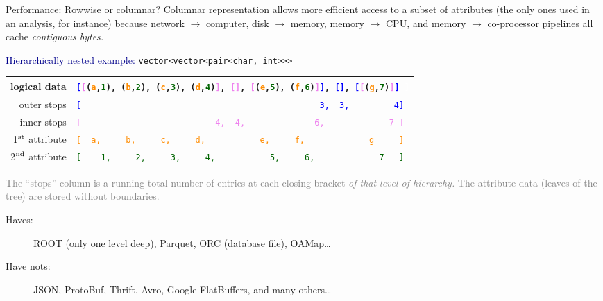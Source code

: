 \documentclass[aspectratio=169]{beamer}
\begin{document}
\begin{frame}{Performance: Rowwise or columnar?}
\vspace{0.35 cm}
Columnar representation allows more efficient access to a subset of attributes (the only ones used in an analysis, for instance) because network $\to$ computer, disk $\to$ memory, memory $\to$ CPU, and memory $\to$ co-processor pipelines all cache {\it contiguous bytes.}

\vspace{0.25 cm}
\textcolor{darkblue}{Hierarchically nested example:} {\tt\small vector<vector<pair<char, int>>>}

\vspace{0.25 cm}
\begin{tabular}{r l}
\small logical data & {\tt\scriptsize \textcolor{blue}{[}\textcolor{violet}{[}(\textcolor{darkorange}{a},\textcolor{darkgreen}{1}), (\textcolor{darkorange}{b},\textcolor{darkgreen}{2}), (\textcolor{darkorange}{c},\textcolor{darkgreen}{3}), (\textcolor{darkorange}{d},\textcolor{darkgreen}{4})\textcolor{violet}{]}, \textcolor{violet}{[]}, \textcolor{violet}{[}(\textcolor{darkorange}{e},\textcolor{darkgreen}{5}), (\textcolor{darkorange}{f},\textcolor{darkgreen}{6})\textcolor{violet}{]}\textcolor{blue}{]}, \textcolor{blue}{[]}, \textcolor{blue}{[}\textcolor{violet}{[}(\textcolor{darkorange}{g},\textcolor{darkgreen}{7})\textcolor{violet}{]}\textcolor{blue}{]}\ \textcolor{white}{]}} \\\hline
\small outer stops & {\tt\scriptsize \textcolor{blue}{[\ \ \ \ \ \ \ \ \ \ \ \ \ \ \ \ \ \ \ \ \ \ \ \ \ \ \ \ \ \ \ \ \ \ \ \ \ \ \ \ \ \ \ \ \ \ \ \ 3,\ \ 3,\ \ \ \ \ \ \ \ \ 4]}} \\
\small inner stops & {\tt\scriptsize \textcolor{violet}{[\ \ \ \ \ \ \ \ \ \ \ \ \ \ \ \ \ \ \ \ \ \ \ \ \ \ \ 4,\ \ 4,\ \ \ \ \ \ \ \ \ \ \ \ \ \ 6,\ \ \ \ \ \ \ \ \ \ \ \ \ 7\ ]}} \\
\small 1$^{\mbox{\scriptsize st}}$ attribute & {\tt\scriptsize \textcolor{darkorange}{[\ \ a,\ \ \ \ \ b,\ \ \ \ \ c,\ \ \ \ \ d,\ \ \ \ \ \ \ \ \ \ \ e,\ \ \ \ \ f,\ \ \ \ \ \ \ \ \ \ \ \ \ g\ \ \ \ \ ]}} \\
\small 2$^{\mbox{\scriptsize nd}}$ attribute & {\tt\scriptsize \textcolor{darkgreen}{[\ \ \ \ 1,\ \ \ \ \ 2,\ \ \ \ \ 3,\ \ \ \ \ 4,\ \ \ \ \ \ \ \ \ \ \ 5,\ \ \ \ \ 6,\ \ \ \ \ \ \ \ \ \ \ \ \ 7\ \ \ ]}}
\end{tabular}

\vspace{0.25 cm}
\textcolor{gray}{The ``stops'' column is a running total number of entries at each closing bracket {\it of that level of hierarchy.} The attribute data (leaves of the tree) are stored without boundaries.}

\vspace{0.25 cm}
\begin{description}
\item[Haves:] ROOT (only one level deep), Parquet, ORC (database file), OAMap\ldots
\item[Have nots:] JSON, ProtoBuf, Thrift, Avro, Google FlatBuffers, and many others\ldots
\end{description}
\end{frame}
\end{document}
